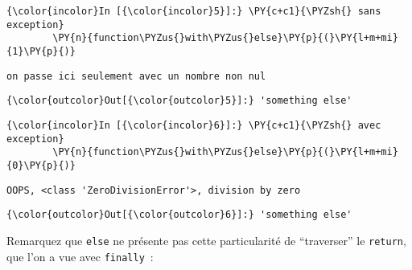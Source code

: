     \begin{Verbatim}[commandchars=\\\{\},frame=single,framerule=0.3mm,rulecolor=\color{cellframecolor}]
{\color{incolor}In [{\color{incolor}5}]:} \PY{c+c1}{\PYZsh{} sans exception}
        \PY{n}{function\PYZus{}with\PYZus{}else}\PY{p}{(}\PY{l+m+mi}{1}\PY{p}{)}
\end{Verbatim}


    \begin{Verbatim}[commandchars=\\\{\},frame=single,framerule=0.3mm,rulecolor=\color{cellframecolor}]
on passe ici seulement avec un nombre non nul
\end{Verbatim}

\begin{Verbatim}[commandchars=\\\{\},frame=single,framerule=0.3mm,rulecolor=\color{cellframecolor}]
{\color{outcolor}Out[{\color{outcolor}5}]:} 'something else'
\end{Verbatim}
            
    \begin{Verbatim}[commandchars=\\\{\},frame=single,framerule=0.3mm,rulecolor=\color{cellframecolor}]
{\color{incolor}In [{\color{incolor}6}]:} \PY{c+c1}{\PYZsh{} avec exception}
        \PY{n}{function\PYZus{}with\PYZus{}else}\PY{p}{(}\PY{l+m+mi}{0}\PY{p}{)}
\end{Verbatim}


    \begin{Verbatim}[commandchars=\\\{\},frame=single,framerule=0.3mm,rulecolor=\color{cellframecolor}]
OOPS, <class 'ZeroDivisionError'>, division by zero
\end{Verbatim}

\begin{Verbatim}[commandchars=\\\{\},frame=single,framerule=0.3mm,rulecolor=\color{cellframecolor}]
{\color{outcolor}Out[{\color{outcolor}6}]:} 'something else'
\end{Verbatim}
            
    Remarquez que \texttt{else} ne présente pas cette particularité de
``traverser'' le \texttt{return}, que l'on a vue avec \texttt{finally}~:

